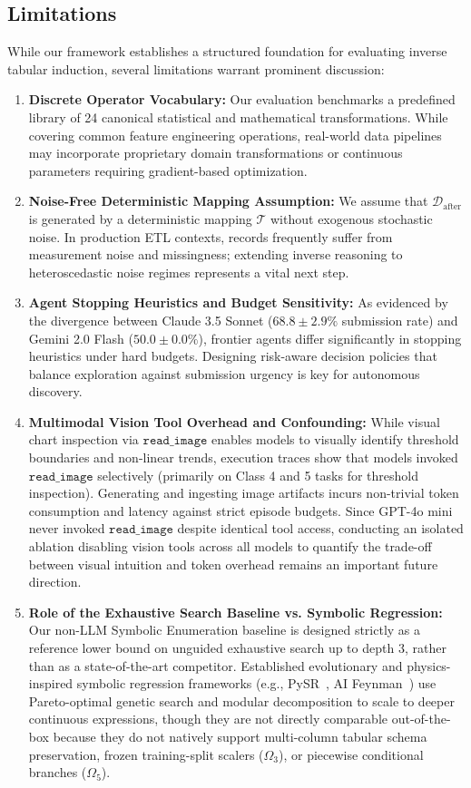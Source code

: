 \documentclass[sigconf]{acmart}
\begin{document}
\subsection{Limitations}
While our framework establishes a structured foundation for evaluating inverse tabular induction, several limitations warrant prominent discussion:
\begin{enumerate}
    \item \textbf{Discrete Operator Vocabulary:} Our evaluation benchmarks a predefined library of 24 canonical statistical and mathematical transformations. While covering common feature engineering operations, real-world data pipelines may incorporate proprietary domain transformations or continuous parameters requiring gradient-based optimization.
    \item \textbf{Noise-Free Deterministic Mapping Assumption:} We assume that $\mathcal{D}_{\text{after}}$ is generated by a deterministic mapping $\mathcal{T}$ without exogenous stochastic noise. In production ETL contexts, records frequently suffer from measurement noise and missingness; extending inverse reasoning to heteroscedastic noise regimes represents a vital next step.
    \item \textbf{Agent Stopping Heuristics and Budget Sensitivity:} As evidenced by the divergence between Claude 3.5 Sonnet ($68.8 \pm 2.9\%$ submission rate) and Gemini 2.0 Flash ($50.0 \pm 0.0\%$), frontier agents differ significantly in stopping heuristics under hard budgets. Designing risk-aware decision policies that balance exploration against submission urgency is key for autonomous discovery.
    \item \textbf{Multimodal Vision Tool Overhead and Confounding:} While visual chart inspection via $\texttt{read\_image}$ enables models to visually identify threshold boundaries and non-linear trends, execution traces show that models invoked $\texttt{read\_image}$ selectively (primarily on Class 4 and 5 tasks for threshold inspection). Generating and ingesting image artifacts incurs non-trivial token consumption and latency against strict episode budgets. Since GPT-4o mini never invoked $\texttt{read\_image}$ despite identical tool access, conducting an isolated ablation disabling vision tools across all models to quantify the trade-off between visual intuition and token overhead remains an important future direction.
    \item \textbf{Role of the Exhaustive Search Baseline vs. Symbolic Regression:} Our non-LLM Symbolic Enumeration baseline is designed strictly as a reference lower bound on unguided exhaustive search up to depth 3, rather than as a state-of-the-art competitor. Established evolutionary and physics-inspired symbolic regression frameworks (e.g., PySR~\cite{cranmer2023pysr}, AI Feynman~\cite{udrescu2020ai}) use Pareto-optimal genetic search and modular decomposition to scale to deeper continuous expressions, though they are not directly comparable out-of-the-box because they do not natively support multi-column tabular schema preservation, frozen training-split scalers ($\Omega_3$), or piecewise conditional branches ($\Omega_5$).

\end{enumerate}
\end{document}
